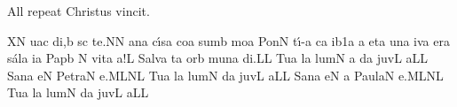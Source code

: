 \bigskip

{\itlyrics All repeat \rm Christus vincit.}

\bigskip

\initiumgregorianum
{}%
\sgn {}{}X\punctum N\egn
{}u\pes ac\egn
\sgn di,\punctum b\egn
\spatium
{}s\punctum c\egn
\sgn te.\punctum N\augmentum N\egn
\spatium
\divisiofinalis
\spatium
{}an\punctum a\egn
\sgn c{\'\i}s\punctum a\egn
\sgn co{}\punctum a\egn
\spatium
\sgn sum\punctum b\egn
\sgn mo{}\punctum a\egn
\spatium
\sgn Pon\punctum N\egn
\sgn t{\'\i}-\punctum a\egn
{}c\punctum a\egn
\sgn {}i{}\episem b1\punctum a\egn
\spatium
\custos a
\lineaproxima
\sgn {}et\punctum a\egn
\spatium
\sgn {}un\punctum a\egn
\sgn {}iv\punctum a\egn
\sgn {}er\punctum a\egn
\sgn s{\'a}l\punctum a\egn
\sgn {}i{}\punctum a\egn
\spatium
\sgn P{a}p\punctum b\egn
\sgn {}{\ae}{}\punctum N\egn
\spatium
\sgn vit\punctum a\egn
\sgn {}a!\engl{~}\punctum L\egn
\spatium
\divisiofinalis
\spatium
\sgn Sa{lv}\punctum a\egn
{}t\punctum a\egn
\sgn {}or\punctum b\egn
\spatium
\sgn m{u}n\punctum a\egn
\sgn di.\punctum L\augmentum L\egn
\spatium
\divisiofinalis
\spatium
\sgn Tu{}\chorus\punctum a\egn
\spatium
{}l\engl{}\punctum a\egn
\sgn lum\punctum N\egn
\spatium
\custos a
\lineaproxima
{}d\punctum a\egn
\sgn juv\punctum L\egn
\sgn {}a{}\punctum L\augmentum L\egn
\spatium
\divisiofinalis
\spatium
\sgn S{a}n\cantores\punctum a\egn
{}e{}\punctum N\egn
\spatium
\sgn P{e}{tr}\clivis aN\egn
\sgn {}e.\clivis ML\augmentumduplex NL\egn
\spatium
\divisiofinalis
\spatium
\sgn Tu{}\chorus\punctum a\egn
\spatium
{}l\punctum a\egn
\sgn lum\punctum N\egn
\spatium
{}d\punctum a\egn
\sgn juv\punctum L\egn
\sgn {}a{}\punctum L\augmentum L\egn
\spatium
\divisiofinalis
\spatium
\sgn S{a}n\cantores\punctum a\egn
{}e{}\punctum N\egn
\spatium
\custos a
\lineaproxima
\sgn P{a}{ul}\clivis aN\egn
\sgn {}e.\clivis ML\augmentumduplex NL\egn
\spatium
\divisiofinalis
\spatium
\sgn Tu{}\chorus\punctum a\egn
\spatium
{}l\punctum a\egn
\sgn lum\punctum N\egn
\spatium
{}d\punctum a\egn
\sgn juv\punctum L\egn
\sgn {}a{}\punctum L\augmentum L\egn
\spatium
\Finisgregoriana

\bigskip

